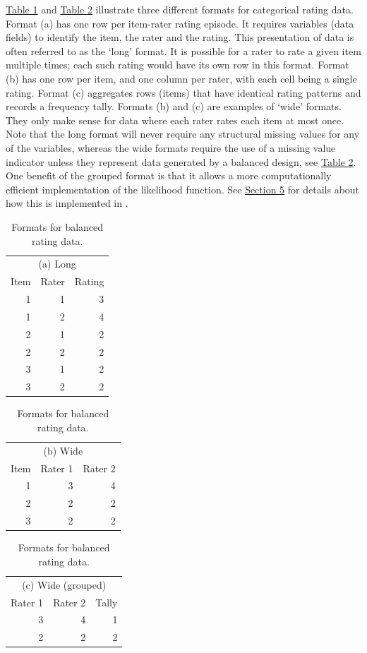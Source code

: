 \protect\hyperlink{tab:data-formats-balanced}{Table 1} and \protect\hyperlink{tab:data-formats-unbalanced}{Table 2}
illustrate three different formats for categorical rating data. Format
(a) has one row per item-rater rating episode. It requires variables
(data fields) to identify the item, the rater and the rating. This
presentation of data is often referred to as the `long' format. It is
possible for a rater to rate a given item multiple times; each such
rating would have its own row in this format. Format (b) has one row per
item, and one column per rater, with each cell being a single rating.
Format (c) aggregates rows (items) that have identical rating patterns
and records a frequency tally. Formats (b) and (c) are examples of
`wide' formats. They only make sense for data where each rater rates
each item at most once. Note that the long format will never require
any structural missing values for any of the variables, whereas the wide formats
require the use of a missing value indicator unless they represent data
generated by a balanced design, see \protect\hyperlink{tab:data-formats-unbalanced}{Table 2}.
One benefit of the grouped format is that it allows a more
computationally efficient implementation of the likelihood function. See
\protect\hyperlink{sec:implementation}{Section 5} for details about how this is implemented in
.

\begin{table}
\caption{\label{tab:data-formats-balanced}Formats for balanced rating data.}

\begin{tabular}{r|r|r}
\hline
\multicolumn{3}{c}{(a) Long} \\
\cline{1-3}
Item & Rater & Rating\\
\hline
1 & 1 & 3\\
\hline
1 & 2 & 4\\
\hline
2 & 1 & 2\\
\hline
2 & 2 & 2\\
\hline
3 & 1 & 2\\
\hline
3 & 2 & 2\\
\hline
\end{tabular}
\begin{tabular}{r|r|r}
\hline
\multicolumn{3}{c}{(b) Wide} \\
\cline{1-3}
Item & Rater 1 & Rater 2\\
\hline
1 & 3 & 4\\
\hline
2 & 2 & 2\\
\hline
3 & 2 & 2\\
\hline
\end{tabular}
\begin{tabular}{r|r|r}
\hline
\multicolumn{3}{c}{(c) Wide (grouped)} \\
\cline{1-3}
Rater 1 & Rater 2 & Tally\\
\hline
3 & 4 & 1\\
\hline
2 & 2 & 2\\
\hline
\end{tabular}
\end{table}


